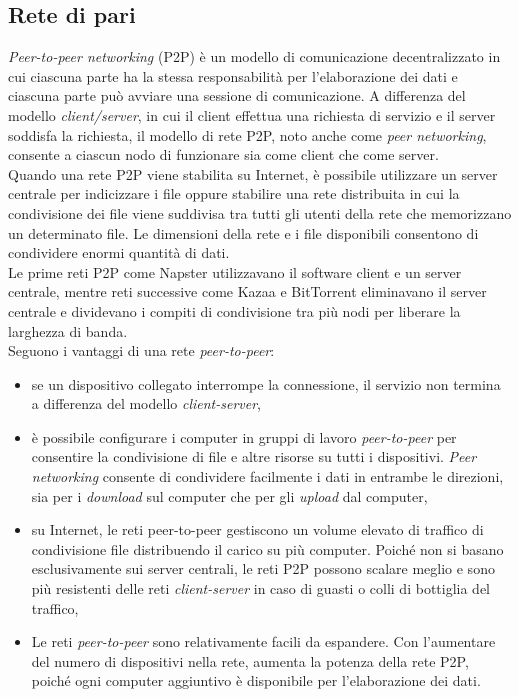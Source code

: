 \subsection{Rete di pari}
\textit{Peer-to-peer networking} (P2P) \`{e} un modello di comunicazione decentralizzato in cui ciascuna parte ha la stessa responsabilit\`{a} per l'elaborazione dei dati e ciascuna parte pu\`{o} avviare una sessione di comunicazione. A differenza del modello\textit{ client/server}, in cui il client effettua una richiesta di servizio e il server soddisfa la richiesta, il modello di rete P2P, noto anche come \textit{peer networking}, consente a ciascun nodo di funzionare sia come client che come server.\cite{etichetta13}\\
Quando una rete P2P viene stabilita su Internet, \`{e} possibile utilizzare un server centrale per indicizzare i file oppure stabilire una rete distribuita in cui la condivisione dei file viene suddivisa tra tutti gli utenti della rete che memorizzano un determinato file. Le dimensioni della rete e i file disponibili consentono di condividere enormi quantit\`{a} di dati.\\ 
Le prime reti P2P come Napster utilizzavano il software client e un server centrale, mentre reti successive come Kazaa e BitTorrent eliminavano il server centrale e dividevano i compiti di condivisione tra pi\`{u} nodi per liberare la larghezza di banda.\\


Seguono i vantaggi di una rete \textit{peer-to-peer}:
\begin{itemize}
\item
se un dispositivo collegato interrompe la connessione, il servizio non termina a differenza del modello \textit{client-server},

\item 
\`{e} possibile configurare i computer in gruppi di lavoro \textit{peer-to-peer} per consentire la condivisione di file e altre risorse su tutti i dispositivi. \textit{Peer networking} consente di condividere facilmente i dati in entrambe le direzioni, sia per i \textit{download} sul computer che per gli \textit{upload} dal computer,

\item
su Internet, le reti peer-to-peer gestiscono un volume elevato di traffico di condivisione file distribuendo il carico su pi\`{u} computer. Poich\'{e} non si basano esclusivamente sui server centrali, le reti P2P possono scalare meglio e sono pi\`{u} resistenti delle reti \textit{client-server} in caso di guasti o colli di bottiglia del traffico,

\item
Le reti \textit{peer-to-peer} sono relativamente facili da espandere. Con l'aumentare del numero di dispositivi nella rete, aumenta la potenza della rete P2P, poich\'{e} ogni computer aggiuntivo \`{e} disponibile per l'elaborazione dei dati.\cite{etichetta14}
\end{itemize}

